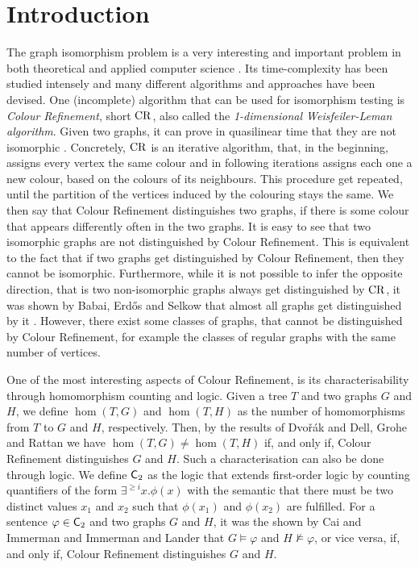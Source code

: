 \section{Introduction}

The graph isomorphism problem is a very interesting and important problem in both theoretical and applied computer science \cite{grohe2020GraphIsomorphism}.
Its time-complexity has been studied intensely and many different algorithms and approaches have been devised.
One (incomplete) algorithm that can be used for isomorphism testing is \emph{Colour Refinement}, short $\operatorname{CR}$, also called the \emph{1-dimensional Weisfeiler-Leman algorithm}.
Given two graphs, it can prove in quasilinear time that they are not isomorphic \cite{berkholz2017TightLowera}.
Concretely, $\operatorname{CR}$ is an iterative algorithm, that, in the beginning, assigns every vertex the same colour and in following iterations assigns each one a new colour, based on the colours of its neighbours.
This procedure get repeated, until the partition of the vertices induced by the colouring stays the same. 
We then say that Colour Refinement distinguishes two graphs, if there is some colour that appears differently often in the two graphs.
It is easy to see that two isomorphic graphs are not distinguished by Colour Refinement.
This is equivalent to the fact that if two graphs get distinguished by Colour Refinement, then they cannot be isomorphic.
Furthermore, while it is not possible to infer the opposite direction, that is two non-isomorphic graphs always get distinguished by $\operatorname{CR}$, it was shown by Babai, Erd\H{o}s and Selkow that almost all graphs get distinguished by it \cite{babai1980RandomGraph}.
However, there exist some classes of graphs, that cannot be distinguished by Colour Refinement, for example the classes of regular graphs with the same number of vertices.

One of the most interesting aspects of Colour Refinement, is its characterisability through homomorphism counting and logic.
Given a tree $T$ and two graphs $G$ and $H$, we define $\hom(T, G)$ and $\hom(T,H)$ as the number of homomorphisms from $T$ to $G$ and $H$, respectively.
Then, by the results of Dvo\v r\'ak \cite{dvorak2010RecognizingGraphsa} and Dell, Grohe and Rattan \cite{dell2018LovaszMeets} we have $\hom(T, G)\neq\hom(T, H)$ if, and only if, Colour Refinement distinguishes $G$ and $H$.
Such a characterisation can also be done through logic.
We define $\mathsf{C}_{2}$ as the logic that extends first-order logic by counting quantifiers of the form $\exists^{\geq i} x.\phi(x)$ with the semantic that there must be two distinct values $x_1$ and $x_2$ such that $\phi(x_1)$ and $\phi(x_2)$ are fulfilled.
For a sentence $\varphi\in \mathsf{C}_{2}$ and two graphs $G$ and $H$, it was the shown by Cai and Immerman \cite{cai1992OptimalLower} and Immerman and Lander \cite{immerman1990DescribingGraphs} that $G\models \varphi$ and $ H\not\models \varphi$, or vice versa, if, and only if, Colour Refinement distinguishes $G$ and $H$.

